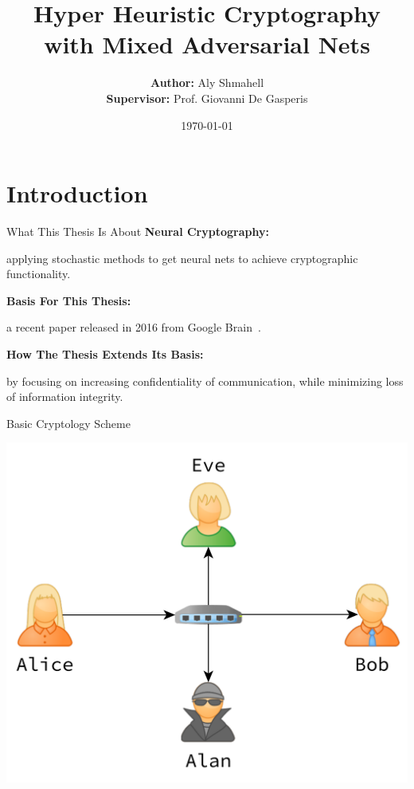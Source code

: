\documentclass{beamer}
\title{Hyper Heuristic Cryptography with Mixed Adversarial Nets}
\date{\today}
\author{\textbf{Author:} Aly Shmahell \\ \textbf{Supervisor:} Prof. Giovanni De Gasperis}
\institute{University of L'Aquila}
\begin{document}
	\maketitle
	\section{Introduction}
		\begin{frame}{What This Thesis Is About}
			\vfill
			\textbf{Neural Cryptography:} \\
			{\centering
				applying stochastic methods to get neural nets to achieve cryptographic functionality.
				\par}
			\vfill
			\textbf{Basis For This Thesis:}\\
			{\centering
				a recent paper released in 2016 from Google Brain~\citep{DBLP:journals/corr/AbadiA16}.
				\par}
			\vfill
			\textbf{How The Thesis Extends Its Basis:}\\
			{\centering
				by focusing on increasing confidentiality of communication, while minimizing loss of information integrity.
			\par}
		\end{frame}
		\begin{frame}{Basic Cryptology Scheme}
			\begin{center}
				\includegraphics[height=0.8\textheight]{Alice-Bob-Eve-Alan}
			\end{center}
		\end{frame}
\end{document}
